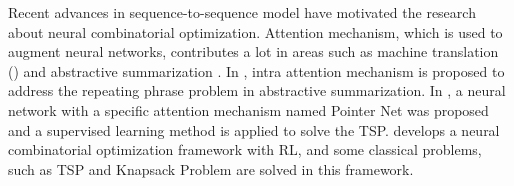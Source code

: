 Recent advances in sequence-to-sequence model \cite{sutskever2014sequence} have motivated the research about neural combinatorial optimization. Attention mechanism, which is used to augment neural networks, contributes a lot in areas such as machine translation (\cite{bahdanau2014neural}) and abstractive summarization \cite{paulus2017deep}. In \cite{paulus2017deep}, intra attention mechanism is proposed to address the repeating phrase problem in abstractive summarization. In \cite{vinyals2015pointer}, a neural network with a specific attention mechanism named Pointer Net was proposed and a supervised learning method is applied to solve the TSP. \cite{bello2016neural} develops a neural combinatorial optimization framework with RL, and some classical problems, such as TSP and Knapsack Problem are solved in this framework. %


